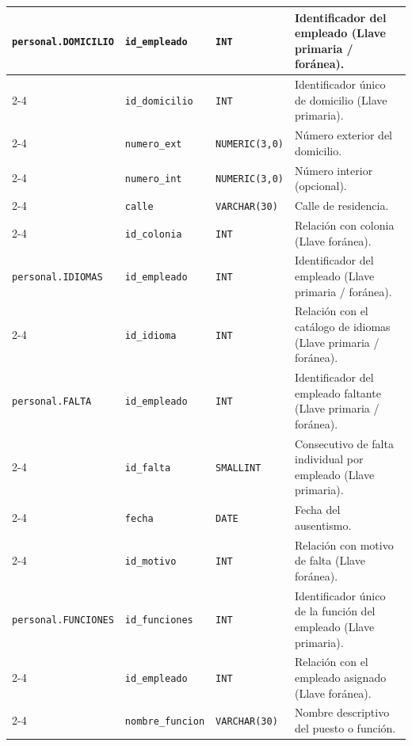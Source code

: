 \begin{longtable}{|p{3.2cm}|p{2.7cm}|p{3.0cm}|p{6.0cm}|}
	\texttt{personal.DOMICILIO} & \texttt{id\_empleado} & \texttt{INT} & Identificador del empleado (Llave primaria / foránea). \\ \cline{2-4}
	& \texttt{id\_domicilio} & \texttt{INT} & Identificador único de domicilio (Llave primaria). \\ \cline{2-4}
	& \texttt{numero\_ext} & \texttt{NUMERIC(3,0)} & Número exterior del domicilio. \\ \cline{2-4}
	& \texttt{numero\_int} & \texttt{NUMERIC(3,0)} & Número interior (opcional). \\ \cline{2-4}
	& \texttt{calle} & \texttt{VARCHAR(30)} & Calle de residencia. \\ \cline{2-4}
	& \texttt{id\_colonia} & \texttt{INT} & Relación con colonia (Llave foránea). \\ \hline
	
	\texttt{personal.IDIOMAS} & \texttt{id\_empleado} & \texttt{INT} & Identificador del empleado (Llave primaria / foránea). \\ \cline{2-4}
	& \texttt{id\_idioma} & \texttt{INT} & Relación con el catálogo de idiomas (Llave primaria / foránea). \\ \hline
	
	\texttt{personal.FALTA} & \texttt{id\_empleado} & \texttt{INT} & Identificador del empleado faltante (Llave primaria / foránea). \\ \cline{2-4}
	& \texttt{id\_falta} & \texttt{SMALLINT} & Consecutivo de falta individual por empleado (Llave primaria). \\ \cline{2-4}
	& \texttt{fecha} & \texttt{DATE} & Fecha del ausentismo. \\ \cline{2-4}
	& \texttt{id\_motivo} & \texttt{INT} & Relación con motivo de falta (Llave foránea). \\ \hline
	
	\texttt{personal.FUNCIONES} & \texttt{id\_funciones} & \texttt{INT} & Identificador único de la función del empleado (Llave primaria). \\ \cline{2-4}
	& \texttt{id\_empleado} & \texttt{INT} & Relación con el empleado asignado (Llave foránea). \\ \cline{2-4}
	& \texttt{nombre\_funcion} & \texttt{VARCHAR(30)} & Nombre descriptivo del puesto o función. \\ \hline
	

\end{longtable}
